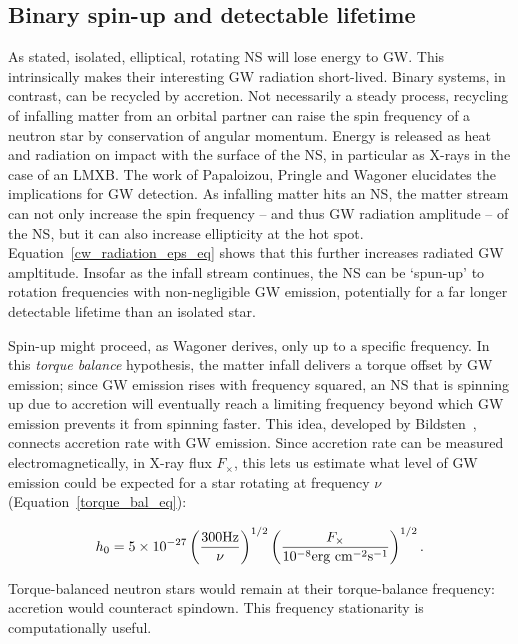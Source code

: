             \subsection{Binary spin-up and detectable lifetime}
            \label{spin-up}
         
As stated, isolated, elliptical, rotating NS will lose energy to GW.
This intrinsically makes their interesting GW radiation short-lived.
Binary systems, in contrast, can be recycled by accretion.
Not necessarily a steady process, recycling of infalling matter from an orbital partner can raise the spin frequency of a neutron star by conservation of angular momentum.
Energy is released as heat and radiation on impact with the surface of the NS, in particular as X-rays in the case of an LMXB.
The work of Papaloizou, Pringle and Wagoner elucidates the implications for GW detection.
As infalling matter hits an NS, the matter stream can not only increase the spin frequency -- and thus GW radiation amplitude -- of the NS, but it can also increase ellipticity at the hot spot.
Equation~\ref{cw_radiation_eps_eq} shows that this further increases radiated GW ampltitude.
Insofar as the infall stream continues, the NS can be `spun-up' to rotation frequencies with non-negligible GW emission, potentially for a far longer detectable lifetime than an isolated star.

Spin-up might proceed, as Wagoner derives, only up to a specific frequency.
In this \textit{torque balance} hypothesis, the matter infall delivers a torque offset by GW emission; since GW emission rises with frequency squared, an NS that is spinning up due to accretion will eventually reach a limiting frequency beyond which GW emission prevents it from spinning faster.
This idea, developed by Bildsten~\cite{Bildsten1998}, connects accretion rate with GW emission.
Since accretion rate can be measured electromagnetically, in X-ray flux $F_\times$, this lets us estimate what level of GW emission could be expected for a star rotating at frequency $\nu$ (Equation~\ref{torque_bal_eq}): 

\begin{equation}
h_{0}=5\times10^{-27}\left(\frac{300\textup{Hz}}{\nu}\right)^{1/2}\left(\frac{F_{\times}}{10^{-8}\textup{erg cm}^{-2}\textup{s}^{-1}}\right)^{1/2}.
\label{torque_bal_eq}
\end{equation}

\noindent Torque-balanced neutron stars would remain at their torque-balance frequency: accretion would counteract spindown.
This frequency stationarity is computationally useful.

